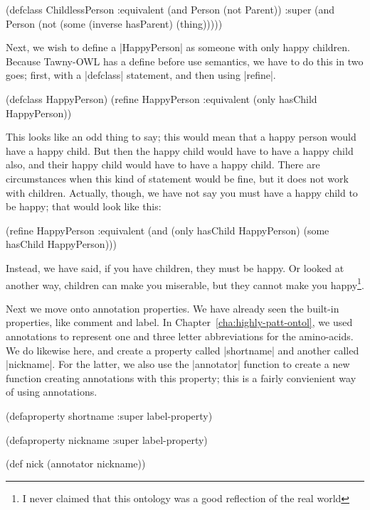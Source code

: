 \begin{tawny}
(defclass ChildlessPerson
  :equivalent (and Person (not Parent))
  :super (and Person
                 (not
                  (some
                   (inverse hasParent)
                   (thing)))))
\end{tawny}

Next, we wish to define a |HappyPerson| as someone with only happy
children. Because Tawny-OWL has a define before use semantics, we have
to do this in two goes; first, with a |defclass| statement, and then
using |refine|.

\begin{tawny}
(defclass HappyPerson)
(refine HappyPerson
        :equivalent (only hasChild HappyPerson))
\end{tawny}

This looks like an odd thing to say; this would mean that a happy
person would have a happy child. But then the happy child would have
to have a happy child also, and their happy child would have to have a
happy child. There are circumstances when this kind of statement would
be fine, but it does not work with children. Actually, though, we have
not say you must have a happy child to be happy; that would look like
this:

\begin{tawnyexample}
(refine HappyPerson
        :equivalent (and (only hasChild HappyPerson)
                         (some hasChild HappyPerson)))
\end{tawnyexample}

Instead, we have said, if you have children, they must be happy. Or
looked at another way, children can make you miserable, but they
cannot make you happy\footnote{I never claimed that this ontology was
  a good reflection of the real world}.

Next we move onto annotation properties. We have already seen the
built-in properties, like comment and label. In
Chapter~\ref{cha:highly-patt-ontol}, we used annotations to represent
one and three letter abbreviations for the amino-acids. We do likewise
here, and create a property called |shortname| and another called
|nickname|. For the latter, we also use the |annotator| function to
create a new function creating annotations with this property; this is
a fairly convienient way of using annotations.

\begin{tawny}
(defaproperty shortname
  :super label-property)

(defaproperty nickname
  :super label-property)

(def nick (annotator nickname))
\end{tawny}

